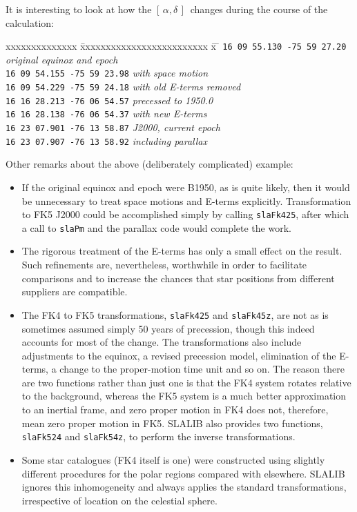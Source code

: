 \documentclass[11pt,fleqn,twoside]{article}
\renewcommand{\_}{{\tt\char'137}}     %
\newcommand{\radec}     {$[\,\alpha,\delta\,]$}
\begin{document}
It is interesting to look at how the \radec\ changes during the
course of the calculation:
\begin{tabbing}
xxxxxxxxxxxxxx \= xxxxxxxxxxxxxxxxxxxxxxxxx \= x \= \kill
\> {\tt 16 09 55.130 -75 59 27.20} \> \> {\it original equinox and epoch} \\
\> {\tt 16 09 54.155 -75 59 23.98} \> \> {\it with space motion} \\
\> {\tt 16 09 54.229 -75 59 24.18} \> \> {\it with old E-terms removed} \\
\> {\tt 16 16 28.213 -76 06 54.57} \> \> {\it precessed to 1950.0} \\
\> {\tt 16 16 28.138 -76 06 54.37} \> \> {\it with new E-terms} \\
\> {\tt 16 23 07.901 -76 13 58.87} \> \> {\it J2000, current epoch} \\
\> {\tt 16 23 07.907 -76 13 58.92} \> \> {\it including parallax}
\end{tabbing}

Other remarks about the above (deliberately complicated) example:
\begin{itemize}
\item If the original equinox and epoch were B1950, as is quite
      likely, then it would be unnecessary to treat space motions
      and E-terms explicitly.  Transformation to FK5 J2000 could
      be accomplished simply by calling
{\tt slaFk425}, after which
      a call to
{\tt slaPm} and the parallax code would complete the
      work.
\item The rigorous treatment of the E-terms
      has only a small effect on the result.  Such refinements
      are, nevertheless, worthwhile in order to facilitate comparisons and
      to increase the chances that star positions from different
      suppliers are compatible.
\item The FK4 to FK5 transformations,
{\tt slaFk425}
      and
{\tt slaFk45z},
      are not as is sometimes assumed simply 50 years of precession,
      though this indeed accounts for most of the change.  The
      transformations also include adjustments
      to the equinox, a revised precession model, elimination of the
      E-terms, a change to the proper-motion time unit and so on.
      The reason there are two functions rather than just one
      is that the FK4 system rotates relative to the background, whereas
      the FK5 system is a much better approximation to an
      inertial frame, and zero proper
      motion in FK4 does not, therefore, mean zero proper motion in FK5.
      SLALIB also provides two functions,
{\tt slaFk524}
      and
{\tt slaFk54z},
      to perform the inverse transformations.
\item Some star catalogues (FK4 itself is one) were constructed using slightly
      different procedures for the polar regions compared with
      elsewhere.  SLALIB ignores this inhomogeneity and always
      applies the standard
      transformations, irrespective of location on the celestial sphere.
\end{itemize}
\end{document}
